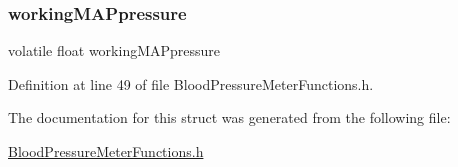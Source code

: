\subsubsection{\texorpdfstring{workingMAPpressure}{workingMAPpressure}}
{\footnotesize\ttfamily volatile float working\+M\+A\+Ppressure}



Definition at line 49 of file Blood\+Pressure\+Meter\+Functions.\+h.



The documentation for this struct was generated from the following file\+:\begin{DoxyCompactItemize}
\item 
\mbox{\hyperlink{_blood_pressure_meter_functions_8h}{Blood\+Pressure\+Meter\+Functions.\+h}}\end{DoxyCompactItemize}
